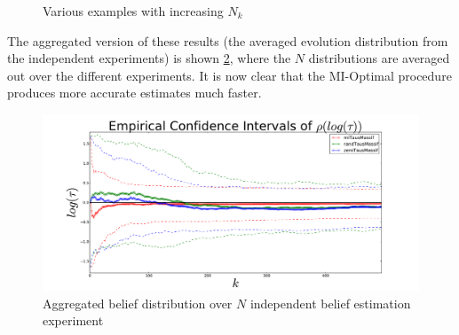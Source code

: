 \documentclass{article}
\begin{document}
\begin{figure}[h]
\begin{center}
{}
\caption[labelInTOC]{Various examples with increasing $N_k$}
\label{fig:online_optimization_more_examples}
\end{center}
\end{figure}


The aggregated version of these results (the averaged evolution distribution
from the independent experiments) is shown
\cref{fig:online_optimization_aggregated_belief_evolution}, where the $N$ distributions are averaged out over the different experiments. It is now clear
that the MI-Optimal procedure produces more accurate estimates much faster.

\begin{figure}[htp]
\begin{center}
  \includegraphics[width=\textwidth]{Figs/HTOnlineEstimator/aggregated_belief_distn_aggregated_ensemble_distn_evolution.pdf}
  \caption[labelInTOC]{Aggregated belief distribution over $N$ independent
  belief estimation experiment }
  \label{fig:online_optimization_aggregated_belief_evolution}
\end{center}
\end{figure}
\clearpage
\end{document}
